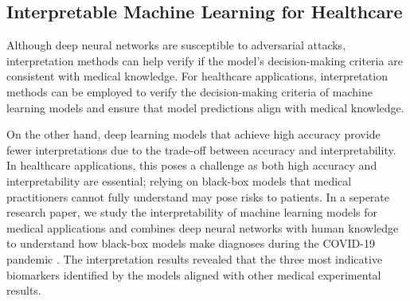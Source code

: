 \subsection{Interpretable Machine Learning for Healthcare}

Although deep neural networks are susceptible to adversarial attacks, interpretation methods can help verify if the model's decision-making criteria are consistent with medical knowledge. For healthcare applications, interpretation methods can be employed to verify the decision-making criteria of machine learning models and ensure that model predictions align with medical knowledge.

On the other hand, deep learning models that achieve high accuracy provide fewer interpretations due to the trade-off between accuracy and interpretability. In healthcare applications, this poses a challenge as both high accuracy and interpretability are essential; relying on black-box models that medical practitioners cannot fully understand may pose risks to patients. In a seperate research paper, we study the interpretability of machine learning models for medical applications and combines deep neural networks with human knowledge to understand how black-box models make diagnoses during the COVID-19 pandemic \citep{han2021interpret}. The interpretation results revealed that the three most indicative biomarkers identified by the models aligned with other medical experimental results.





